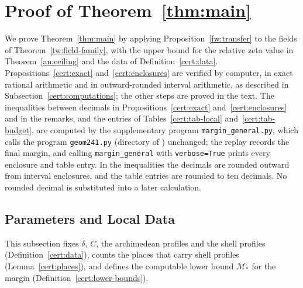 \section{Proof of Theorem~\ref{thm:main}}
\label{sec:certificate}

We prove Theorem~\ref{thm:main} by applying
Proposition~\ref{fw:transfer} to the fields of
Theorem~\ref{tw:field-family}, with the upper bound for the relative
zeta value in Theorem~\ref{an:ceiling} and the data of
Definition~\ref{cert:data}. Propositions~\ref{cert:exact}
and~\ref{cert:enclosures} are verified by computer, in exact rational
arithmetic and in outward-rounded interval arithmetic, as described in
Subsection~\ref{cert:computations}; the other steps are proved in the
text. The inequalities between decimals in
Propositions~\ref{cert:exact} and~\ref{cert:enclosures} and in the remarks,
and the entries of Tables~\ref{cert:tab-local} and~\ref{cert:tab-budget},
are computed by the supplementary program
\texttt{margin\_general.py}, which calls the program \texttt{geom241.py}
(directory  of \cite{NaslundCode4317})
unchanged; the replay records the final margin, and
calling \texttt{margin\_general} with \texttt{verbose=True} prints every
enclosure and table entry. In the inequalities the decimals are rounded
outward from interval enclosures, and the table entries are rounded to
ten decimals. No rounded decimal is substituted into a later calculation.

\subsection{Parameters and Local Data}

This subsection fixes $\delta$, $C$, the archimedean profiles and the shell
profiles (Definition~\ref{cert:data}), counts the places that carry shell
profiles (Lemma~\ref{cert:places}), and defines the computable lower bound
$\mathcal M_*$ for the margin (Definition~\ref{cert:lower-bounds}).

